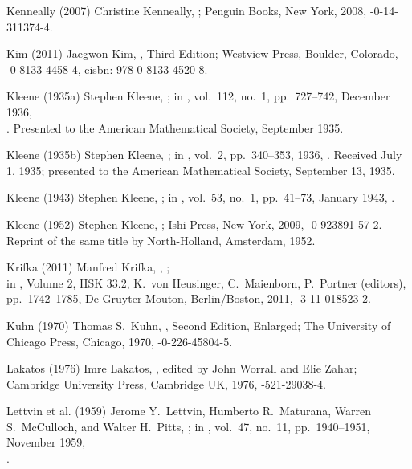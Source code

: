 \biblabel Kenneally (2007)
Christine Kenneally,
;
Penguin Books, New York, 2008,
-0-14-311374-4.

\biblabel Kim (2011)
Jaegwon Kim,
, Third Edition;
Westview Press, Boulder, Colorado,
-0-8133-4458-4,
e{\sc isbn}: 978-0-8133-4520-8.

\biblabel Kleene (1935a)
Stephen Kleene,
;
in ,
vol.\ 112, no.\ 1, pp.\ 727--742, December 1936,\\
.
Presented to the American Mathematical Society,
September 1935.

\biblabel Kleene (1935b)
Stephen Kleene,
;
in ,
vol.\ 2, pp.\ 340--353, 1936,
.
Received July 1, 1935;
presented to the American Mathematical Society, September 13, 1935.

\biblabel Kleene (1943)
Stephen Kleene,
;
in ,
vol.\ 53, no.\ 1, pp.\ 41--73, January 1943,
.

\biblabel Kleene (1952)
Stephen Kleene,
;
Ishi Press, New York, 2009,
-0-923891-57-2.
Reprint of the same title by
North-Holland, Amsterdam, 1952.

\biblabel Krifka (2011)
Manfred Krifka,
,
;\\
in ,
 Volume 2, HSK 33.2,
 K.\ von Heusinger, C.\ Maienborn, P.\ Portner (editors),
pp.\ 1742--1785,
De Gruyter Mouton, Berlin/Boston, 2011,
-3-11-018523-2.

\biblabel Kuhn (1970)
Thomas S.\ Kuhn,
,
Second Edition, Enlarged;
The University of Chicago Press, Chicago, 1970,
-0-226-45804-5.

\biblabel Lakatos (1976)
Imre Lakatos,
,
edited by John Worrall and Elie Zahar;
Cambridge University Press, Cambridge UK, 1976,
-521-29038-4.

\biblabel Lettvin et al. (1959)
Jerome Y.\ Lettvin, Humberto R.\ Maturana,
Warren S.\ McCulloch, and Walter H.\ Pitts,
;
in ,
vol.\ 47, no.\ 11, pp.\ 1940--1951, November 1959,\\
.

